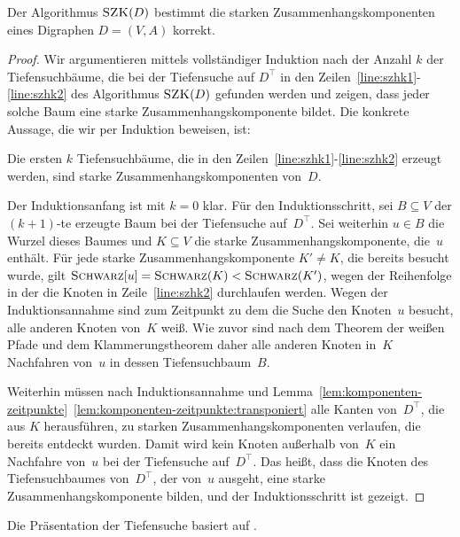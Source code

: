 \begin{thm}
Der Algorithmus $\mathop{\text{\textsc{SZK}}}(D)$ bestimmt die starken Zusammenhangskomponenten eines Digraphen $D=(V,A)$ korrekt.
\end{thm}
\begin{proof}
Wir argumentieren mittels vollständiger Induktion nach der Anzahl $k$ der Tiefensuch\-bäume, die bei der Tiefensuche auf $D^\top$ in den Zeilen~\ref{line:szhk1}-\ref{line:szhk2} des Algorithmus $\mathop{\text{\textsc{SZK}}}(D)$ gefunden werden und zeigen, dass jeder solche Baum eine starke Zusammenhangskomponente bildet.
Die konkrete Aussage, die wir per Induktion beweisen, ist:
\begin{center}
\glqq Die ersten $k$ Tiefensuchbäume, die in den Zeilen~\ref{line:szhk1}-\ref{line:szhk2} erzeugt werden, sind starke Zusammenhangskomponenten von~$D$.\grqq
\end{center}

\noindent Der Induktionsanfang ist mit $k=0$ klar.
Für den Induktionsschritt, sei $B \subseteq V$ der $(k+1)$-te erzeugte Baum bei der Tiefensuche auf~$D^\top$.
Sei weiterhin $u \in B$ die Wurzel dieses Baumes und $K \subseteq V$ die starke Zusammenhangskomponente, die~$u$ enthält.
Für jede starke Zusammenhangskomponente $K' \neq K$, die bereits besucht wurde, gilt $\mathop{\text{\textsc{Schwarz}}}[u] = \mathop{\text{\textsc{Schwarz}}}(K) < \mathop{\text{\textsc{Schwarz}}}(K')$, wegen der Reihenfolge in der die Knoten in Zeile~\ref{line:szhk2} durchlaufen werden.
Wegen der Induktionsannahme sind zum Zeitpunkt zu dem die Suche den Knoten~$u$ besucht, alle anderen Knoten von~$K$ weiß.
Wie zuvor sind nach dem Theorem der weißen Pfade und dem Klammerungstheorem daher alle anderen Knoten in~$K$ Nachfahren von~$u$ in dessen Tiefensuchbaum~$B$.

Weiterhin müssen nach Induktionsannahme und Lemma~\ref{lem:komponenten-zeitpunkte}~\ref{lem:komponenten-zeitpunkte:transponiert} alle Kanten von~$D^\top$, die aus $K$ herausführen, zu starken Zusammenhangskomponenten verlaufen, die bereits entdeckt wurden.
Damit wird kein Knoten außerhalb von~$K$ ein Nachfahre von~$u$ bei der Tiefensuche auf~$D^\top$.
Das heißt, dass die Knoten des Tiefensuchbaumes von~$D^\top$, der von~$u$ ausgeht, eine starke Zusammenhangskomponente bilden, und der Induktionsschritt ist gezeigt.
\end{proof}


\begin{bem}
	Die Präsentation der Tiefensuche basiert auf  \cite{CLRS17}.
\end{bem} 